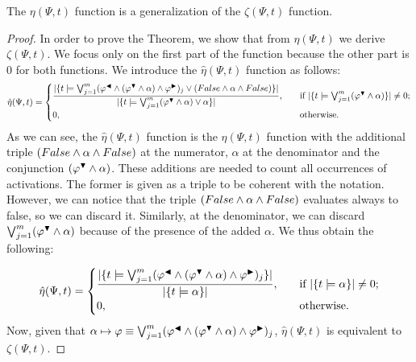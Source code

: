 \begin{theorem}\label{th:my-theorem}
The $\eta(\Psi, t)$ function is a generalization of the $\zeta(\Psi, t)$ function.
\end{theorem}
\begin{proof}
In order to prove the Theorem, we show that from $\eta(\Psi, t)$ we derive $\zeta(\Psi, t)$. We focus only on the first part of the function because the other part is $0$ for both functions. We introduce the $\hat{\eta}(\Psi, t)$ function as follows:
\[   
\hat{\eta}(\Psi,t) = 
     \begin{cases}
       \dfrac{\lvert \{t \models \bigvee^{m}_{j=1} (\varphi^{\blacktriangleleft} \wedge (\varphi^{\blacktriangledown} \wedge \alpha) \wedge \varphi^{\blacktriangleright})_j \vee (False \wedge \alpha \wedge False)\} \rvert}{\lvert \{t \models \bigvee^{m}_{j=1} (\varphi^{\blacktriangledown} \wedge \alpha) \vee \alpha\} \rvert}, &\quad\text{if } \lvert \{t \models \bigvee^{m}_{j=1} (\varphi^{\blacktriangledown} \wedge \alpha)\} \rvert \neq 0 ;\\
       0, &\quad\text{otherwise.} \\
     \end{cases}
\]
As we can see, the $\hat{\eta}(\Psi, t)$ function is the $\eta(\Psi, t)$ function with the additional triple $(False \wedge \alpha \wedge False)$ at the numerator, $\alpha$ at the denominator and the conjunction $(\varphi^{\blacktriangledown} \wedge \alpha)$. These additions are needed to count all occurrences of activations. The former is given as a triple to be coherent with the notation. However, we can notice that the triple $(False \wedge \alpha \wedge False)$ evaluates always to false, so we can discard it. Similarly, at the denominator, we can discard $\bigvee^{m}_{j=1} (\varphi^{\blacktriangledown} \wedge \alpha)$ because of the presence of the added $\alpha$. We thus obtain the following:

\[   
\hat{\eta}(\Psi,t) = 
     \begin{cases}
       \dfrac{\lvert \{t \models \bigvee^{m}_{j=1} (\varphi^{\blacktriangleleft} \wedge (\varphi^{\blacktriangledown} \wedge \alpha) \wedge \varphi^{\blacktriangleright})_j\} \rvert}{\lvert \{t \models \alpha\} \rvert}, &\quad\text{if } \lvert \{t \models \alpha\} \rvert \neq 0 ;\\
       0, &\quad\text{otherwise.} \\
     \end{cases}
\]
Now, given that $\alpha \mapsto \varphi \equiv \bigvee^{m}_{j=1} (\varphi^{\blacktriangleleft} \wedge (\varphi^{\blacktriangledown} \wedge \alpha) \wedge \varphi^{\blacktriangleright})_j$, $\hat{\eta}(\Psi, t)$ is equivalent to $\zeta(\Psi, t)$.
\end{proof}

